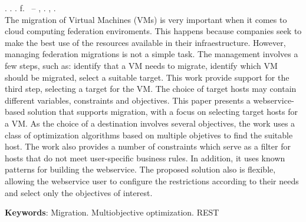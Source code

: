 \begin{resumo}[ABSTRACT]
\begin{SingleSpacing}

\imprimirautorcitacao. \imprimirtitleabstract. \imprimirdata. \pageref {LastPage} f. \imprimirprojeto\ – \imprimirprograma, \imprimirinstituicao. \imprimirlocal, \imprimirdata.\\

The migration of Virtual Machines (VMs) is very important when it comes to cloud computing federation enviroments. 
This happens because companies seek to make the best use of the resources available in their infraestructure.
However, managing federation migrations is not a simple task. The management involves a few steps, such as: 
identify that a VM needs to migrate, identify which VM 
should be migrated, select a suitable target.
This work provide support for the third step, selecting a target for the VM. 
The choice of target hosts may contain different variables, constraints and objectives. 
This paper presents a webservice-based solution that supports migration, with a focus on selecting target hosts for a VM.
As the choice of a destination involves several objectives, the work uses a class of optimization algorithms based on
multiple objetives to find the suitable host. The work also provides a number of constraints
which serve as a filter for hosts that do not meet user-specific business rules.
In addition, it uses known patterns for building the webservice.
The proposed solution also is flexible, 
allowing the webservice user to configure the restrictions according to their needs and
select only the objectives of interest.


\textbf{Keywords}: Migration. Multiobjective optimization. REST 

\end{SingleSpacing}
\end{resumo}
